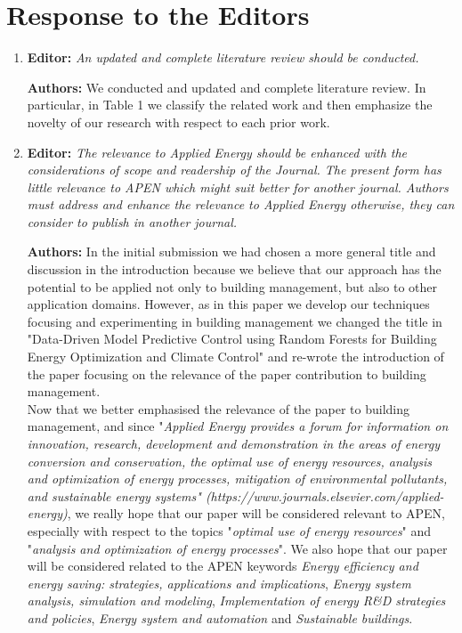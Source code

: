 \documentclass{article}
\begin{document}
\section{Response to the Editors}



\begin{enumerate}

	

	\item \textbf{Editor:} \textit{An updated and complete literature review should be conducted.}

		

	\textbf{Authors:} We conducted and updated and complete literature review. In particular, in Table 1 we classify the related work and then emphasize the novelty of our research with respect to each prior work.



	\item \textbf{Editor:} \textit{The relevance to Applied Energy should be enhanced with the considerations of scope and readership of the Journal. The present form has little relevance to APEN which might suit better for another journal. Authors must address and enhance the relevance to Applied Energy otherwise, they can consider to publish in another journal.}

	

	\textbf{Authors:} In the initial submission we had chosen a more general title and discussion in the introduction because we believe that our approach has the potential to be applied not only to building management, but also to other application domains. However, as in this paper we develop our techniques focusing and experimenting in building management we changed the title in "Data-Driven Model Predictive Control using Random Forests for Building Energy Optimization and Climate Control" and re-wrote the introduction of the paper focusing on the relevance of the paper contribution to building management.\\
	Now that we better emphasised the relevance of the paper to building management, and since "\textit{Applied Energy provides a forum for information on innovation, research, development and demonstration in the areas of energy conversion and conservation, the optimal use of energy resources, analysis and optimization of energy processes, mitigation of environmental pollutants, and sustainable energy systems" (https://www.journals.elsevier.com/applied-energy)}, we really hope that our paper will be considered relevant to APEN, especially with respect to the topics "\textit{optimal use of energy resources}" and "\textit{analysis and optimization of energy processes}". We also hope that our paper will be considered related to the APEN keywords \textit{Energy efficiency and energy saving: strategies, applications and implications}, \textit{Energy system analysis, simulation and modeling}, \textit{Implementation of energy R\&D strategies and policies}, \textit{Energy system and automation} and \textit{Sustainable buildings}.



\end{enumerate}
\end{document}
